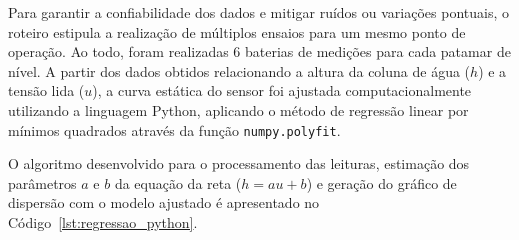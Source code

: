 \documentclass[a4paper,12pt]{article}
\begin{document}
\begin{justify}
    \hspace{4ex}Para garantir a confiabilidade dos dados e mitigar ruídos ou variações pontuais, o roteiro estipula a realização de múltiplos ensaios para um mesmo ponto de operação. Ao todo, foram realizadas 6 baterias de medições para cada patamar de nível. A partir dos dados obtidos relacionando a altura da coluna de água ($h$) e a tensão lida ($u$), a curva estática do sensor foi ajustada computacionalmente utilizando a linguagem Python, aplicando o método de regressão linear por mínimos quadrados através da função \texttt{numpy.polyfit}.
\end{justify}

\begin{justify}
    \hspace{4ex}O algoritmo desenvolvido para o processamento das leituras, estimação dos parâmetros $a$ e $b$ da equação da reta ($h = au + b$) e geração do gráfico de dispersão com o modelo ajustado é apresentado no Código~\ref{lst:regressao_python}.
\end{justify}
\end{document}
